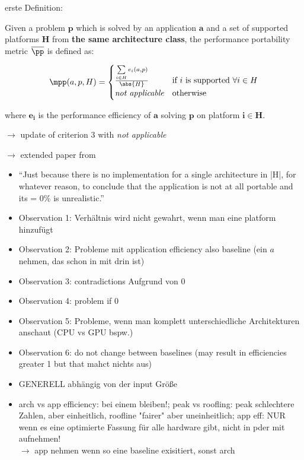 erste Definition:
\begin{definition}\label{def:mpp}
    Given a problem $\mathbf{p}$ which is solved by an application $\mathbf{a}$ and a set of supported platforms $\mathbf{H}$ from \textbf{the same architecture class}, the performance portability metric $\overline{\pp}$ is defined as:

    \[ \mpp(a, p, H) = 
        \begin{cases}
            \frac{\sum\limits_{i \in H} e_i(a, p)}{\abs{H}} & \text{if }i\text{ is supported }\forall i \in H \\
            \textit{not applicable}                         & \text{otherwise}
        \end{cases} 
    \]

    where $\mathbf{e_i}$ is the performance efficiency of $\mathbf{a}$ solving $\mathbf{p}$ on platform $\mathbf{i \in H}$.
\end{definition}
$\rightarrow$ update of criterion 3 with \textit{not applicable}

\newpage
\cite{marowka_reformulation_2022}
$\rightarrow$ extended paper from \cite{marowka_toward_2021}

\begin{itemize}
    \item \enquote{Just because there is no implementation for a single architecture in |H|, for whatever reason, to conclude that the application is not at all portable and its = 0\% is unrealistic.}
    \item Observation 1: Verhältnis wird nicht gewahrt, wenn man eine platform hinzufügt
    \item Observation 2: Probleme mit application efficiency also baseline (ein $a$ nehmen, das schon in \pp mit drin ist)
    \item Observation 3: contradictions Aufgrund von 0
    \item Observation 4: problem if $0$
    \item Observation 5: Probleme, wenn man komplett unterschiedliche Architekturen anschaut (CPU vs GPU bspw.)
    \item Observation 6: do not change between baselines (may result in efficiencies greater 1 but that mahct nichts aus)
    \item \pp GENERELL abhängig von der input Größe
    \item arch vs app efficiency: bei einem bleiben!; peak vs roofling: peak schlechtere Zahlen, aber einheitlich, roofline "fairer" aber uneinheitlich; app eff: NUR wenn es eine optimierte Fassung für alle hardware gibt, nicht in \pp pder \mpp mit aufnehmen! \\$\rightarrow$ app nehmen wenn so eine baseline exisitiert, sonst arch 
\end{itemize}

